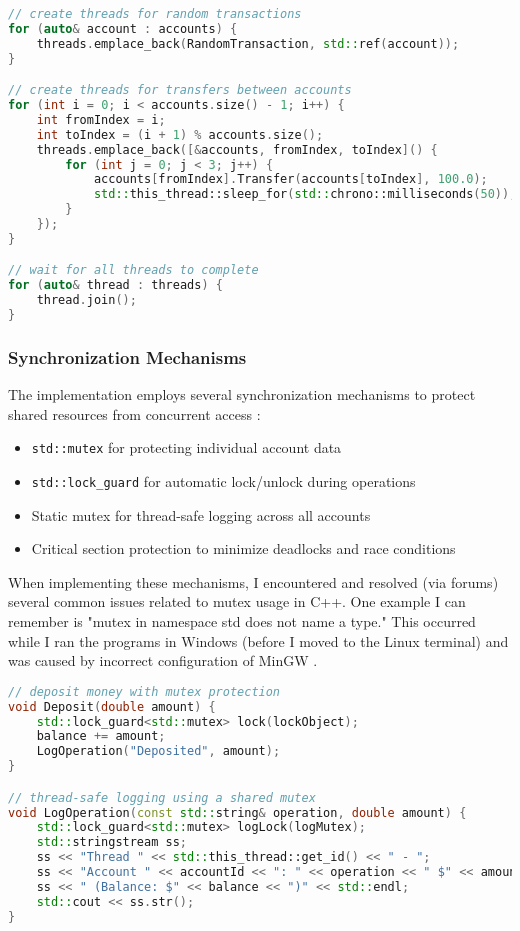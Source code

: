 \documentclass[12pt]{article}
\begin{document}
\begin{lstlisting}[language=C++, caption=Thread Creation Example]
// create threads for random transactions
for (auto& account : accounts) {
    threads.emplace_back(RandomTransaction, std::ref(account));
}

// create threads for transfers between accounts
for (int i = 0; i < accounts.size() - 1; i++) {
    int fromIndex = i;
    int toIndex = (i + 1) % accounts.size();
    threads.emplace_back([&accounts, fromIndex, toIndex]() {
        for (int j = 0; j < 3; j++) {
            accounts[fromIndex].Transfer(accounts[toIndex], 100.0);
            std::this_thread::sleep_for(std::chrono::milliseconds(50));
        }
    });
}

// wait for all threads to complete
for (auto& thread : threads) {
    thread.join();
}
\end{lstlisting}

\subsubsection{Synchronization Mechanisms}
The implementation employs several synchronization mechanisms to protect shared resources from concurrent access \cite{cpp_mutex}:

\begin{itemize}
    \item \texttt{std::mutex} for protecting individual account data
    \item \texttt{std::lock\_guard} for automatic lock/unlock during operations \cite{cpp_lock_guard}
    \item Static mutex for thread-safe logging across all accounts
    \item Critical section protection to minimize deadlocks and race conditions
\end{itemize}

When implementing these mechanisms, I encountered and resolved (via forums) several common issues related to mutex usage in C++. One example I can remember is "mutex in namespace std does not name a type." This occurred while I ran the programs in Windows (before I moved to the Linux terminal) and was caused by incorrect configuration of MinGW \cite{stackoverflow_mutex}.

\begin{lstlisting}[language=C++, caption=Mutex and Lock Guard Usage]
// deposit money with mutex protection
void Deposit(double amount) {
    std::lock_guard<std::mutex> lock(lockObject);
    balance += amount;
    LogOperation("Deposited", amount);
}

// thread-safe logging using a shared mutex
void LogOperation(const std::string& operation, double amount) {
    std::lock_guard<std::mutex> logLock(logMutex);
    std::stringstream ss;
    ss << "Thread " << std::this_thread::get_id() << " - ";
    ss << "Account " << accountId << ": " << operation << " $" << amount;
    ss << " (Balance: $" << balance << ")" << std::endl;
    std::cout << ss.str();
}
\end{lstlisting}
\end{document}
